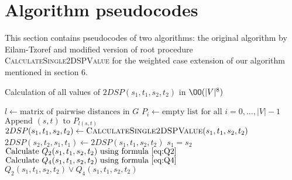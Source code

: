 \section{Algorithm pseudocodes}

This section contains pseudocodes of two algorithms: the original algorithm by Eilam-Tzoref \cite{ET} and modified version of root procedure \textsc{CalculateSingle2DSPValue} for the weighted case extension of our algorithm mentioned in section 6.

\begin{algorithm}
\caption{Calculation of all values of $2DSP(s_1, t_1, s_2, t_2)$ in $\OO(|V|^8)$} \label{alg:n8}
\begin{algorithmic}[1]
\State $l \gets \text{matrix of pairwise distances in }G$ \label{line:floyd}
\State $P_i \gets \text{empty list for all }i = 0, \ldots, |V|-1$
    \State $\text{Append }(s, t)\text{ to }P_{l(s, t)}$
\EndFor
{}
                \State $2DSP(s_1, t_1, s_2, t_2) \gets \textsc{CalculateSingle2DSPValue}(s_1, t_1, s_2, t_2)$
                \State $2DSP(s_2, t_2, s_1, t_1) \gets 2DSP(s_1, t_1, s_2, t_2)$ 
            \EndFor
        \EndFor
    \EndFor
\EndFor
\EndProcedure
\Statex
{}
    \State \Return $s_1 = s_2$ \label{line:a}
    \State {} \label{line:b} 
\Else
    \State $\text{Calculate }Q_2(s_1, t_1, s_2, t_2)\text{ using formula \eqref{eq:Q2}}$ \label{line:cQ2}
    \State $\text{Calculate }Q_4(s_1, t_1, s_2, t_2)\text{ using formula \eqref{eq:Q4}}$ \label{line:cQ4}
    \State \Return $Q_2(s_1, t_1, s_2, t_2) \vee Q_4(s_1, t_1, s_2, t_2)$
\EndIf
\EndProcedure
\end{algorithmic}
\end{algorithm}


